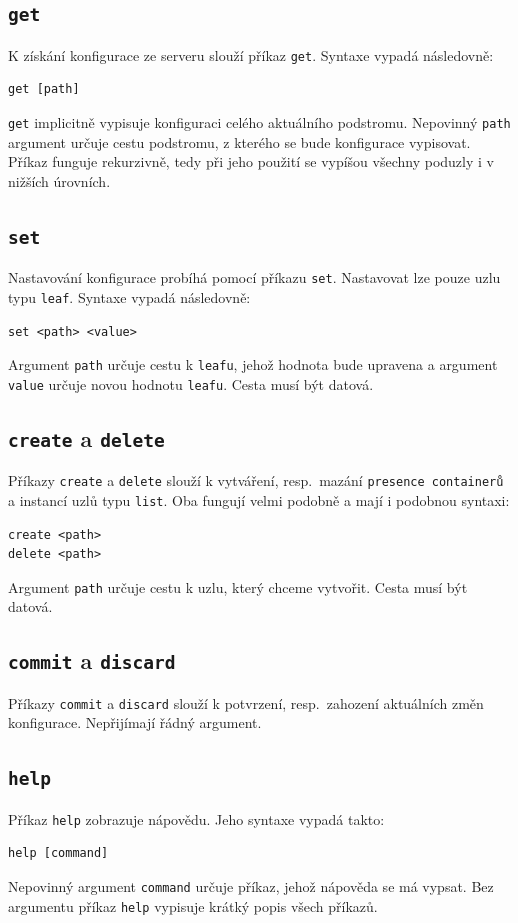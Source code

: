\documentclass[thesis=B,czech,hidelinks]{FITthesis}[2019/03/06]
\begin{document}
\subsection{\texttt{get}}

K získání konfigurace ze serveru slouží příkaz \texttt{get}. Syntaxe vypadá následovně:
\begin{verbatim}
get [path]
\end{verbatim}
\texttt{get} implicitně vypisuje konfiguraci celého aktuálního podstromu. Nepovinný \texttt{path} argument určuje cestu podstromu, z kterého se bude konfigurace vypisovat. Příkaz funguje rekurzivně, tedy při jeho použití se vypíšou všechny poduzly i v nižších úrovních.

\subsection{\texttt{set}}
Nastavování konfigurace probíhá pomocí příkazu \texttt{set}. Nastavovat lze pouze uzlu typu \texttt{leaf}. Syntaxe vypadá následovně:
\begin{verbatim}
set <path> <value>
\end{verbatim}
Argument \texttt{path} určuje cestu k \texttt{leafu}, jehož hodnota bude upravena a argument \texttt{value} určuje novou hodnotu \texttt{leafu}. Cesta musí být datová.

\subsection{\texttt{create} a \texttt{delete}}
Příkazy \texttt{create} a \texttt{delete} slouží k vytváření, resp.\ mazání \texttt{presence containerů} a instancí uzlů typu \texttt{list}. Oba fungují velmi podobně a mají i podobnou syntaxi:
\begin{verbatim}
create <path>
delete <path>
\end{verbatim}
Argument \texttt{path} určuje cestu k uzlu, který chceme vytvořit. Cesta musí být datová.
\subsection{\texttt{commit} a \texttt{discard}}
Příkazy \texttt{commit} a \texttt{discard} slouží k potvrzení, resp.\ zahození aktuálních změn konfigurace. Nepřijímají řádný argument.
\subsection{\texttt{help}}
Příkaz \texttt{help} zobrazuje nápovědu. Jeho syntaxe vypadá takto:
\begin{verbatim}
help [command]
\end{verbatim}
Nepovinný argument \texttt{command} určuje příkaz, jehož nápověda se má vypsat. Bez argumentu příkaz \texttt{help} vypisuje krátký popis všech příkazů.
\end{document}
